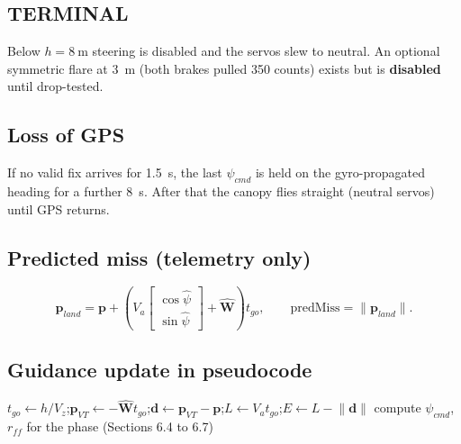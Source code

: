 \documentclass[11pt,a4paper]{article}
\newcommand{\code}[1]{\texttt{#1}}
\newcommand{\vect}[1]{\mathbf{#1}}
\begin{document}
\subsection{TERMINAL}
Below $h = \SI{8}{\meter}$ steering is disabled and the servos slew to
neutral. An optional symmetric flare at \SI{3}{\meter} (both brakes pulled
350 counts) exists but is \textbf{disabled} until drop-tested.

\subsection{Loss of GPS}
If no valid fix arrives for \SI{1.5}{\second}, the last $\psi_{cmd}$ is held
on the gyro-propagated heading for a further \SI{8}{\second}. After that the
canopy flies straight (neutral servos) until GPS returns.

\subsection{Predicted miss (telemetry only)}
\begin{equation}
  \vect p_{land} = \vect p + \left(V_a\begin{bmatrix}\cos\hat\psi\\ \sin\hat\psi\end{bmatrix} + \hat{\vect W}\right)t_{go},
  \qquad \text{predMiss} = \lVert\vect p_{land}\rVert .
\end{equation}

\subsection{Guidance update in pseudocode}
\begin{algorithm}[H]
\small
\caption{\code{Guidance::update}, run at every GPS fix (\SI{5}{\hertz})}
\KwIn{$\vect p$, $h$, $V_z$, $V_a$, $\hat{\vect W}$, $\hat\psi$}
$t_{go} \leftarrow h/V_z$;\quad $\vect p_{VT} \leftarrow -\hat{\vect W} t_{go}$;\quad $\vect d \leftarrow \vect p_{VT} - \vect p$;\quad $L \leftarrow V_a t_{go}$;\quad $E \leftarrow L - \lVert\vect d\rVert$\;
compute $\psi_{cmd}$, $r_{ff}$ for the phase (Sections 6.4 to 6.7)\;
\end{algorithm}
\end{document}
